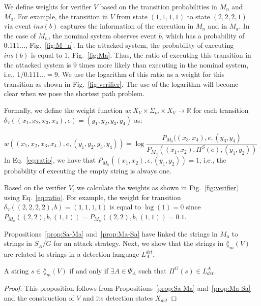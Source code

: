 We define weights for verifier $V$ based on the transition probabilities in $M_n$ and $M_a$.
For example, the transition in $V$ from state $(1,1,1,1)$ to state $(2,2,2,1)$ via event $ins(b)$ captures the information of the execution in $M_n$ and in $M_a$.
In the case of $M_n$, the nominal system observes event $b$, which has a probability of $0.111\dots$, Fig.~\ref{fig:M_n}.
In the attacked system, the probability of executing $ins(b)$ is equal to $1$, Fig.~\ref{fig:Ma}.
Thus, the ratio of executing this transition in the attacked system is $9$ times more likely than executing in the nominal system, i.e., $1/0.111\dots = 9$.
We use the logarithm of this ratio as a weight for this transition as shown in Fig.~\ref{fig:verifier}.
The use of the logarithm will become clear when we pose the shortest path problem.

Formally, we define the weight function $w:X_V\times \Sigma_m\times X_V\rightarrow \mathbb{R}$ for each transition $\delta_V((x_1,x_2,x_3,x_4),e) = (y_1,y_2,y_3,y_4)$ as:

\begin{equation}\label{eq:ratio}
w((x_1,x_2,x_3,x_4),e,(y_1,y_2,y_3,y_4)) = \log \frac{P_{M_a}((x_3,x_4),e,(y_3,y_4)}{P_{M_n}((x_1,x_2),\Pi^S(e),(y_1,y_2))}
\end{equation}
In Eq.~\ref{eq:ratio}, we have that $P_{M_n}((x_1,x_2),\epsilon,(y_1,y_2)) = 1$, i.e., the probability of executing the empty string is always one.


Based on the verifier $V$, we calculate the weights as shown in Fig.~\ref{fig:verifier} using Eq.~\ref{eq:ratio}.
For example, the weight for transition $\delta_V((2,2,2,2),b) = (1,1,1,1)$ is equal to $\log{(1)}=0$ since $P_{M_a}((2,2),b,(1,1)) = P_{M_n}((2,2),b,(1,1)) = 0.1$.

Propositions~\ref{prop:Sa-Ma} and~\ref{prop:Ma-Sa} have linked the strings in $M_a$ to strings in $S_A/G$ for an attack strategy.
Next, we show that the strings in $\lang_m(V)$ are related to strings in a detection language $L_A^{det}$.

\begin{proposition}\label{prop:det_lang}
A string $s\in \lang_m(V)$ if and only if $\exists A\in \Psi_A$ such that $\Pi^G(s)\in L_{det}^A$.
\end{proposition}
\begin{proof}
This proposition follows from Propositions~\ref{prop:Sa-Ma} and~\ref{prop:Ma-Sa} and the construction of $V$ and its detection states $X_{det}$    
\end{proof}

